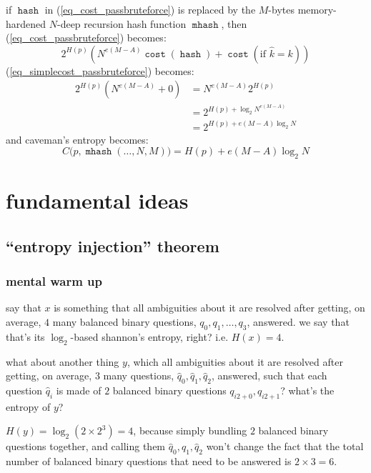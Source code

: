 \documentclass[twocolumn]{article}
\DeclareMathOperator{\hash}{\mathtt{hash}}
\DeclareMathOperator{\mhash}{\mathtt{mhash}}
\DeclareMathOperator{\cost}{\mathtt{cost}}
\begin{document}
if $\hash$ in (\ref{eq_cost_passbruteforce}) is replaced by the $M$-bytes
memory-hardened $N$-deep recursion hash function $\mhash$, then
(\ref{eq_cost_passbruteforce}) becomes:
\begin{equation}\label{eq_cost_passbruteforce_NM}
    2^{H(p)} \left(
        N^{e(M-A)}\cost(\hash) + \cost(\text{if } \hat k = k)
    \right)
\end{equation}
(\ref{eq_simplecost_passbruteforce}) becomes:
\begin{equation}\label{eq_simplecost_passbruteforce_NM}
    \begin{split}
    2^{H(p)} (N^{e(M-A)}+0) &= N^{e(M-A)} 2^{H(p)} \\
                  &= 2^{H(p) + \log_2 N^{e(M-A)}} \\
                  &= 2^{H(p) + e(M-A)\log_2 N}
    \end{split}
\end{equation}
and caveman's entropy becomes:
\begin{equation}
    C\Big(p, \mhash(\ldots, N, M)\Big) = H(p) + e(M-A)\log_2 N
\end{equation}

\section{fundamental ideas}

\subsection{``entropy injection'' theorem}
\subsubsection{mental warm up}
say that $x$ is something that all ambiguities about it are resolved after
getting, on average, $4$ many balanced binary questions, $q_0, q_1, \ldots,
q_3$, answered.  we say that that's its $\log_2$-based shannon's entropy,
right?  i.e. $H(x) = 4$.

what about another thing $y$, which all ambiguities about it are resolved
after getting, on average, $3$ many questions, $\hat q_0, \hat q_1, \hat
q_2$, answered, such that each question $\hat q_i$ is made of $2$ balanced
binary questions $q_{i2+0}, q_{i2+1}$?  what's the entropy of $y$?

$H(y) = \log_2(2 \times 2^3) = 4$, because simply bundling $2$ balanced
binary questions together, and calling them $\hat q_0, \hat q_1, \hat q_2$
won't change the fact that the total number of balanced binary questions
that need to be answered is $2 \times 3 = 6$.
\end{document}

